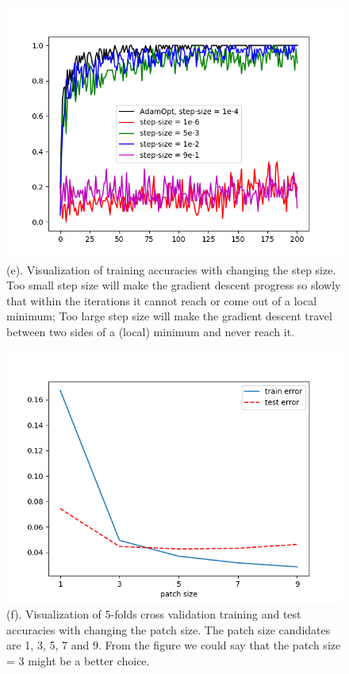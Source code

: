 \documentclass[11pt]{article} %
\begin{document}
\begin{figure}[htb]
  \centering
  \centerline{\includegraphics[width=1\textwidth ]{Figure_2_5.png}}
  \vspace{-5pt}
    \centering
\caption{(e). Visualization of training accuracies with changing the step size. Too small step size will make the gradient descent progress so slowly that within the iterations it cannot reach or come out of a local minimum; Too large step size will make the gradient descent travel between two sides of a (local) minimum and never reach it.}
\vspace{-1pt}
\end{figure}
\clearpage

\begin{figure}[htb]
  \centering
  \centerline{\includegraphics[width=1\textwidth ]{hyper_patch_size.png}}
  \vspace{-5pt}
    \centering
\caption{(f). Visualization of 5-folds cross validation training and test accuracies with changing the patch size. The patch size candidates are 1, 3, 5, 7 and 9. From the figure we could say that the patch size = 3 might be a better choice.}
\vspace{-1pt}
\end{figure}
\end{document}
